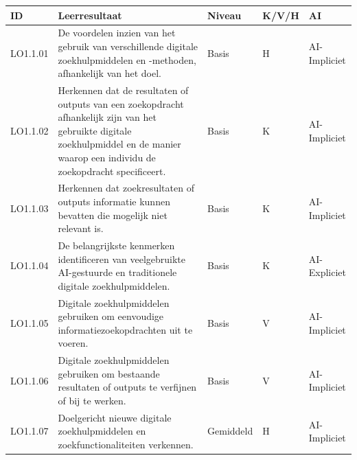 \documentclass[
  dutch,
  letterpaper,
  DIV=11,
  numbers=noendperiod]{scrartcl}
\begin{document}
\begin{longtable}[]{@{}
  >{\centering\arraybackslash}p{}
  >{\centering\arraybackslash}p{}
  >{\centering\arraybackslash}p{}
  >{\centering\arraybackslash}p{}
  >{\centering\arraybackslash}p{}@{}}
\toprule\noalign{}
\begin{minipage}[b]{\linewidth}\centering
ID
\end{minipage} & \begin{minipage}[b]{\linewidth}\centering
Leerresultaat
\end{minipage} & \begin{minipage}[b]{\linewidth}\centering
Niveau
\end{minipage} & \begin{minipage}[b]{\linewidth}\centering
K/V/H
\end{minipage} & \begin{minipage}[b]{\linewidth}\centering
AI
\end{minipage} \\
\midrule\noalign{}
\endhead
\bottomrule\noalign{}
\endlastfoot
LO1.1.01 & De voordelen inzien van het gebruik van verschillende
digitale zoekhulpmiddelen en -methoden, afhankelijk van het doel. &
Basis & H & AI-Impliciet \\
LO1.1.02 & Herkennen dat de resultaten of outputs van een zoekopdracht
afhankelijk zijn van het gebruikte digitale zoekhulpmiddel en de manier
waarop een individu de zoekopdracht specificeert. & Basis & K &
AI-Impliciet \\
LO1.1.03 & Herkennen dat zoekresultaten of outputs informatie kunnen
bevatten die mogelijk niet relevant is. & Basis & K & AI-Impliciet \\
LO1.1.04 & De belangrijkste kenmerken identificeren van veelgebruikte
AI-gestuurde en traditionele digitale zoekhulpmiddelen. & Basis & K &
AI-Expliciet \\
LO1.1.05 & Digitale zoekhulpmiddelen gebruiken om eenvoudige
informatiezoekopdrachten uit te voeren. & Basis & V & AI-Impliciet \\
LO1.1.06 & Digitale zoekhulpmiddelen gebruiken om bestaande resultaten
of outputs te verfijnen of bij te werken. & Basis & V & AI-Impliciet \\
LO1.1.07 & Doelgericht nieuwe digitale zoekhulpmiddelen en
zoekfunctionaliteiten verkennen. & Gemiddeld & H & AI-Impliciet \\

\end{longtable}
\end{document}
